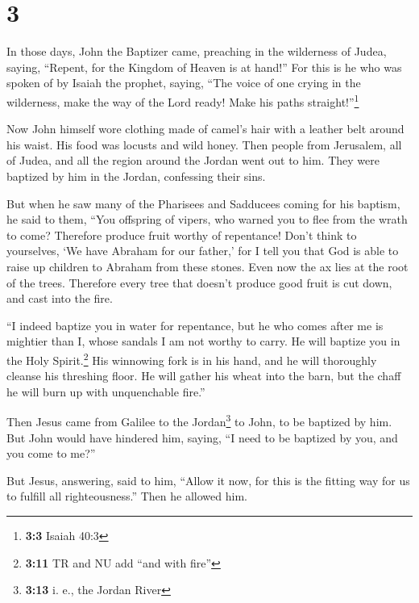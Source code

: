 \hypertarget{section-2}{%
\section{3}\label{section-2}}

 In those days, John the Baptizer came, preaching in the
wilderness of Judea, saying,  ``Repent, for the Kingdom of
Heaven is at hand!''  For this is he who was spoken of by
Isaiah the prophet, saying, ``The voice of one crying in the wilderness,
make the way of the Lord ready! Make his paths straight!''\footnote{\textbf{3:3}
  Isaiah 40:3}

 Now John himself wore clothing made of camel's hair with
a leather belt around his waist. His food was locusts and wild honey.
 Then people from Jerusalem, all of Judea, and all the
region around the Jordan went out to him.  They were
baptized by him in the Jordan, confessing their sins.

 But when he saw many of the Pharisees and Sadducees
coming for his baptism, he said to them, ``You offspring of vipers, who
warned you to flee from the wrath to come?  Therefore
produce fruit worthy of repentance!  Don't think to
yourselves, `We have Abraham for our father,' for I tell you that God is
able to raise up children to Abraham from these stones. 
Even now the ax lies at the root of the trees. Therefore every tree that
doesn't produce good fruit is cut down, and cast into the fire.

 ``I indeed baptize you in water for repentance, but he
who comes after me is mightier than I, whose sandals I am not worthy to
carry. He will baptize you in the Holy Spirit.\footnote{\textbf{3:11} TR
  and NU add ``and with fire''}  His winnowing fork is in
his hand, and he will thoroughly cleanse his threshing floor. He will
gather his wheat into the barn, but the chaff he will burn up with
unquenchable fire.''

 Then Jesus came from Galilee to the Jordan\footnote{\textbf{3:13}
  i. e., the Jordan River} to John, to be baptized by him.
 But John would have hindered him, saying, ``I need to be
baptized by you, and you come to me?''

 But Jesus, answering, said to him, ``Allow it now, for
this is the fitting way for us to fulfill all righteousness.'' Then he
allowed him.

